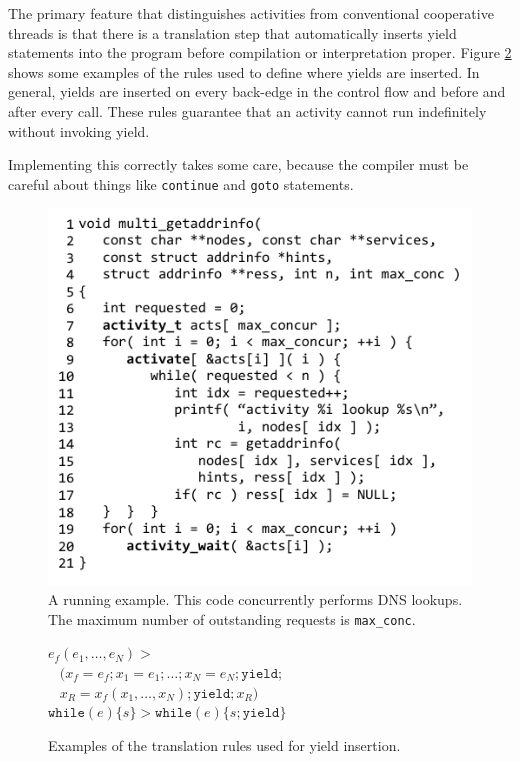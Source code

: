 \documentclass[9pt,preprint]{sigplanconf-2}
\begin{document}
The primary feature that distinguishes activities from conventional cooperative threads is that there is a translation step that automatically inserts yield statements into the program before compilation or interpretation proper.
Figure \ref{fig:translation} shows some examples of the rules used to define where yields are inserted.
In general, yields are inserted on every back-edge in the control flow and before and after every call.
These rules guarantee that an activity cannot run indefinitely without invoking yield.

Implementing this correctly takes some care, because the compiler must be careful about things like \texttt{continue} and \texttt{goto} statements.

\begin{figure}
\includegraphics{multi_getaddrinfo}
\caption{A running example.
  This code concurrently performs DNS lookups.
  The maximum number of outstanding requests is \texttt{max\_conc}.}
\label{fig:charcoal_multidns}
\end{figure}

\begin{figure}
  $e_f(e_1, \ldots, e_N) >$ \\
  \ \hspace{1em} $( x_f=e_f; x_1=e_1; \ldots; x_N=e_N; \mathtt{yield};$ \\
  \ \hspace{2em} $x_R=x_f(x_1, \ldots, x_N); \mathtt{yield}; x_R )$ \\
  $\mathtt{while}( e ) \{ s \} > \mathtt{while}( e ) \{ s; \mathtt{yield} \}$
\caption{Examples of the translation rules used for yield insertion.}
\label{fig:translation}
\end{figure}
\end{document}
